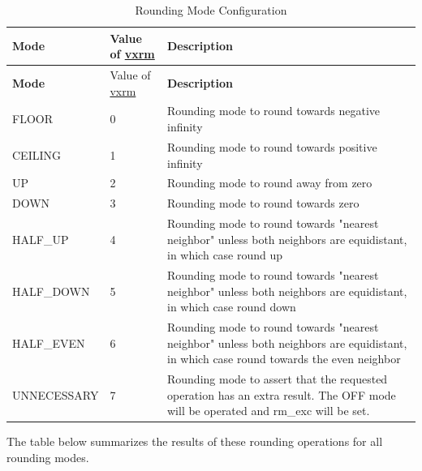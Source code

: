 \documentclass[main\_\_EN.tex]{subfiles}
\begin{document}
\begin{longtable}[c]{|l|l|m{10cm}|}
    \caption{Rounding Mode Configuration}
    \label{tab:ESP-rounding-mode-config}\\
    \hline
    \rowcolor{lightgray}
    \textbf{Mode} & Value of \hyperref[vxrm]{vxrm} & \textbf{Description} \\\hline
    \endfirsthead
    \rowcolor{lightgray}
    \textbf{Mode} & Value of \hyperref[vxrm]{vxrm} & \textbf{Description} \\\hline
    \endhead
    \endfoot

FLOOR & 0 & Rounding mode to round towards negative infinity \\\hline

CEILING & 1 & Rounding mode to round towards positive infinity \\\hline

UP & 2 & Rounding mode to round away from zero \\\hline

DOWN & 3 & Rounding mode to round towards zero \\\hline

HALF\_UP & 4 & Rounding mode to round towards "nearest neighbor" unless both neighbors are equidistant, in which case round up \\\hline

HALF\_DOWN & 5 & Rounding mode to round towards "nearest neighbor" unless both neighbors are equidistant, in which case round down \\\hline

HALF\_EVEN & 6 & Rounding mode to round towards "nearest neighbor" unless both neighbors are equidistant, in which case round towards the even neighbor \\\hline

UNNECESSARY & 7 & Rounding mode to assert that the requested operation has an extra result. The OFF mode will be operated and rm\_exc will be set. \\\hline

    \end{longtable}

The table below summarizes the results of these rounding operations for all rounding modes.
\end{document}
